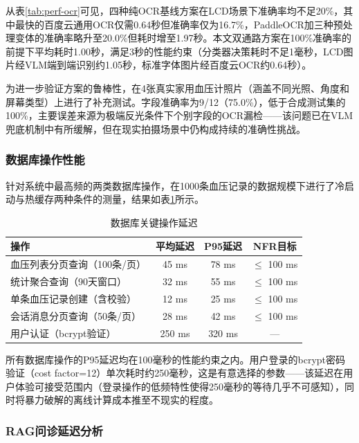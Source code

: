 \documentclass[zihao=-4,a4paper]{ctexart}
\numberwithin{figure}{section}
\numberwithin{table}{section}
\begin{document}
从表\ref{tab:perf-ocr}可见，四种纯OCR基线方案在LCD场景下准确率均不足20\%，其中最快的百度云通用OCR仅需0.64秒但准确率仅为16.7\%，PaddleOCR加三种预处理变体的准确率略升至20.0\%但耗时增至1.97秒。本文双通路方案在100\%准确率的前提下平均耗时1.00秒，满足3秒的性能约束（分类器决策耗时不足1毫秒，LCD图片经VLM端到端识别约1.05秒，标准字体图片经百度云OCR约0.64秒）。

为进一步验证方案的鲁棒性，在4张真实家用血压计照片（涵盖不同光照、角度和屏幕类型）上进行了补充测试。字段准确率为9/12（75.0\%），低于合成测试集的100\%，主要误差来源为极端反光条件下个别字段的OCR漏检——该问题已在VLM兜底机制中有所缓解，但在现实拍摄场景中仍构成持续的准确性挑战。

\subsubsection{数据库操作性能}

针对系统中最高频的两类数据库操作，在1000条血压记录的数据规模下进行了冷启动与热缓存两种条件的测量，结果如表\ref{tab:perf-db}所示。

\begin{table}[H]
\centering
\caption{数据库关键操作延迟}
\label{tab:perf-db}
\begin{tabular}{lccc}
\toprule
\textbf{操作} & \textbf{平均延迟} & \textbf{P95延迟} & \textbf{NFR目标} \\
\midrule
血压列表分页查询（100条/页） & 45 ms & 78 ms & $\leq$ 100 ms \\
统计聚合查询（90天窗口） & 32 ms & 55 ms & $\leq$ 100 ms \\
单条血压记录创建（含校验） & 12 ms & 25 ms & $\leq$ 100 ms \\
会话消息分页查询（50条/页） & 28 ms & 42 ms & $\leq$ 100 ms \\
用户认证（bcrypt验证） & 250 ms & 320 ms & — \\
\midrule
\end{tabular}
\end{table}

所有数据库操作的P95延迟均在100毫秒的性能约束之内。用户登录的bcrypt密码验证（cost factor=12）单次耗时约250毫秒，这是有意选择的参数——该延迟在用户体验可接受范围内（登录操作的低频特性使得250毫秒的等待几乎不可感知），同时将暴力破解的离线计算成本推至不现实的程度。

\subsubsection{RAG问诊延迟分析}
\end{document}
